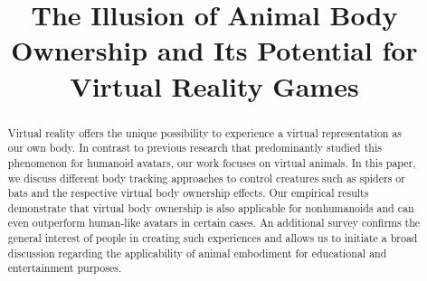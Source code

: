 \documentclass[conference]{IEEEtran}
\begin{document}
\title{The Illusion of Animal Body Ownership and Its Potential for Virtual Reality Games}





\author{
\and
{}
\and
{}
}



\maketitle

\begin{abstract}
Virtual reality offers the unique possibility to experience a virtual representation as our own body. In contrast to previous research that predominantly studied this phenomenon for humanoid avatars, our work focuses on virtual animals. In this paper, we discuss different body tracking approaches to control creatures such as spiders or bats and the respective virtual body ownership effects. Our empirical results demonstrate that virtual body ownership is also applicable for nonhumanoids and can even outperform human-like avatars in certain cases. An additional survey confirms the general interest of people in creating such experiences and allows us to initiate a broad discussion regarding the applicability of animal embodiment for educational and entertainment purposes.
\end{abstract}
\end{document}
